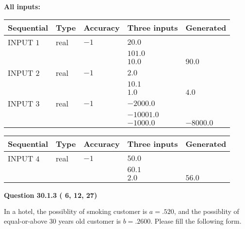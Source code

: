 \documentclass[12pt]{article}
\begin{document}
   
   
   
\noindent\vspace{0.1in}\hspace{-0.08in} {\textbf{\Large{All inputs: }}}
   
   
  
  
\noindent\begin{tabular}{|l|l|l|l|l|}
\hline
 Sequential & Type & Accuracy & Three inputs & Generated \\ 
\hline
 
 
  INPUT $           1$ & real & $          -1 $ & $
 20.0
  $ & \\
  & & &  $
 101.0
  $ & \\
  & & &  $
 10.0
 $ & $ 90.0 $ 
 \\  \hline  
 
 
  INPUT $           2$ & real & $          -1 $ & $
 2.0
  $ & \\
  & & &  $
 10.1
  $ & \\
  & & &  $
 1.0
 $ & $ 4.0 $ 
 \\  \hline  
 
 
  INPUT $           3$ & real & $          -1 $ & $
 -2000.0
  $ & \\
  & & &  $
 -10001.0
  $ & \\
  & & &  $
 -1000.0
 $ & $ -8000.0 $ 
 \\  \hline  
 \end{tabular}
   
   
  
  
\noindent\begin{tabular}{|l|l|l|l|l|}
\hline
 Sequential & Type & Accuracy & Three inputs & Generated \\ 
\hline
 
 
  INPUT $           4$ & real & $          -1 $ & $
 50.0
  $ & \\
  & & &  $
 60.1
  $ & \\
  & & &  $
 2.0
 $ & $ 56.0 $ 
 \\  \hline  
 \end{tabular}
   
   
  
\vspace{0.2in}
  
{\textbf{\Large{Question
30.1.3 
 (          6,         12,         27)
}}}
  
  
In a hotel, the possiblity of  %
smoking customer is
$a =  %
.520$, and the possiblity of  %
equal-or-above 30 years old customer is $ b =  %
.2600$.
Please fill the following form.
 
\end{document}
